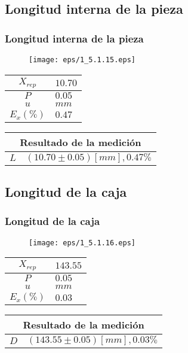 \documentclass[letter,11pt]{beamer}
\begin{document}
\subsection{Longitud interna de la pieza}
\begin{frame}
\frametitle{Longitud interna de la pieza}
\vspace*{0.8cm}
\begin{figure}
\centering
\texttt{[image: eps/1\_5.1.15.eps]}
\end{figure}
\vspace*{0.4cm}
\scriptsize
\begin{tabular}{|c|>{\centering}m{1.8cm}<{\centering}|}
\hline
$X_{rep}$ &  $10.70$ \tabularnewline \hline
      $P$ &   $0.05$ \tabularnewline \hline
      $u$ &     $mm$ \tabularnewline \hline
$E_x(\%)$ &   $0.47$ \tabularnewline \hline
\end{tabular}
\quad
\begin{tabular}{|c|>{\centering}m{5.7cm}<{\centering}|}
\hline
\multicolumn{2}{|c|}{\textbf{Resultado de la medición}} \\ \hline
$L$ & $( 10.70\pm0.05)[mm], 0.47\%$ \tabularnewline \hline
\end{tabular}
\end{frame}

\subsection{Longitud de la caja}
\begin{frame}
\frametitle{Longitud de la caja}
\vspace*{0.8cm}
\begin{figure}
\centering
\texttt{[image: eps/1\_5.1.16.eps]}
\end{figure}
\vspace*{0.4cm}
\scriptsize
\begin{tabular}{|c|>{\centering}m{1.8cm}<{\centering}|}
\hline
$X_{rep}$ & $143.55$ \tabularnewline \hline
      $P$ &   $0.05$ \tabularnewline \hline
      $u$ &     $mm$ \tabularnewline \hline
$E_x(\%)$ &   $0.03$ \tabularnewline \hline
\end{tabular}
\quad
\begin{tabular}{|c|>{\centering}m{5.7cm}<{\centering}|}
\hline
\multicolumn{2}{|c|}{\textbf{Resultado de la medición}} \\ \hline
$D$ & $(143.55\pm0.05)[mm], 0.03\%$ \tabularnewline \hline
\end{tabular}
\end{frame}
\end{document}
